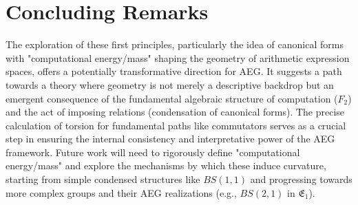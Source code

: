 \documentclass[12pt, a4paper]{article}
\theoremstyle{definition}
\begin{document}
\section{Concluding Remarks}
The exploration of these first principles, particularly the idea of canonical forms with "computational energy/mass" shaping the geometry of arithmetic expression spaces, offers a potentially transformative direction for AEG. It suggests a path towards a theory where geometry is not merely a descriptive backdrop but an emergent consequence of the fundamental algebraic structure of computation ($F_2$) and the act of imposing relations (condensation of canonical forms). The precise calculation of torsion for fundamental paths like commutators serves as a crucial step in ensuring the internal consistency and interpretative power of the AEG framework. Future work will need to rigorously define "computational energy/mass" and explore the mechanisms by which these induce curvature, starting from simple condensed structures like $BS(1,1)$ and progressing towards more complex groups and their AEG realizations (e.g., $BS(2,1)$ in $\mathfrak{E}_1$).

% 
% 
\end{document}
